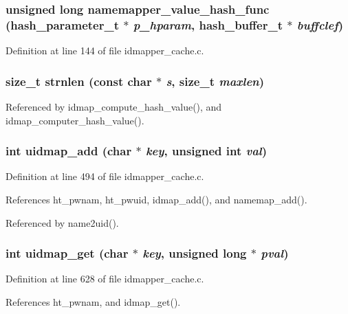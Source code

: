 \subsubsection{\setlength{\rightskip}{0pt plus 5cm}unsigned long namemapper\_\-value\_\-hash\_\-func (hash\_\-parameter\_\-t $\ast$ {\em p\_\-hparam}, hash\_\-buffer\_\-t $\ast$ {\em buffclef})}\label{idmapper__cache_8c_a7}




Definition at line 144 of file idmapper\_\-cache.c.
\subsubsection{\setlength{\rightskip}{0pt plus 5cm}size\_\-t strnlen (const char $\ast$ {\em s}, size\_\-t {\em maxlen})}\label{idmapper__cache_8c_a5}




Referenced by idmap\_\-compute\_\-hash\_\-value(), and idmap\_\-computer\_\-hash\_\-value().
\subsubsection{\setlength{\rightskip}{0pt plus 5cm}int uidmap\_\-add (char $\ast$ {\em key}, unsigned int {\em val})}\label{idmapper__cache_8c_a21}




Definition at line 494 of file idmapper\_\-cache.c.

References ht\_\-pwnam, ht\_\-pwuid, idmap\_\-add(), and namemap\_\-add().

Referenced by name2uid().
\subsubsection{\setlength{\rightskip}{0pt plus 5cm}int uidmap\_\-get (char $\ast$ {\em key}, unsigned long $\ast$ {\em pval})}\label{idmapper__cache_8c_a27}




Definition at line 628 of file idmapper\_\-cache.c.

References ht\_\-pwnam, and idmap\_\-get().

